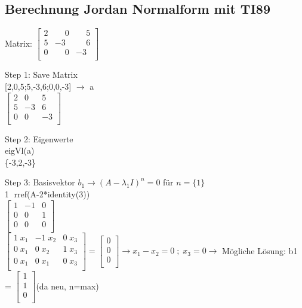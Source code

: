 \subsection{Berechnung Jordan Normalform mit TI89}
Matrix:
$\begin{bmatrix} %
	2 & \phantom{-}0 & \phantom{-}5\\
	5 & -3 & \phantom{-}6\\
	0 & \phantom{-}0 & -3\\
\end{bmatrix}$

Step 1: Save Matrix\\{}
[2,0,5;5,-3,6;0,0,-3] $\rightarrow$ a\\
\hspace*{2cm}$\begin{bmatrix} %
	2 & 0 & 5\\
	5 & -3 & 6\\
	0 & 0 & -3\\
\end{bmatrix}$

Step 2: Eigenwerte\\
eigVl(a)\\
\hspace*{2cm} \{-3,2,-3\}

Step 3: Basisvektor $b_1 \rightarrow (A- \lambda_1 I)^n = 0$ für $n=\{1\}$\\
\textcircled{1} rref(A-2*identity(3))\\
\hspace*{2cm}$\begin{bmatrix}
	1 & -1 & 0\\
	0 & 0 & 1\\
	0 & 0 & 0\\
\end{bmatrix}$\\

$\begin{bmatrix}
	1\;x_1 & -1\;x_2 & 0\;x_3\\
	0\;x_1 & 0\;x_2 & 1\;x_3\\
	0\;x_1 & 0\;x_1 & 0\;x_3\\
\end{bmatrix} = \begin{bmatrix}
	0\\
	0\\
	0\\
\end{bmatrix} \rightarrow x_1-x_2=0 \; ; \; x_3=0 \rightarrow$ Mögliche Lösung: b1 = $\begin{bmatrix}
	1\\
	1\\
	0\\
\end{bmatrix}$(da neu, n=max)\\

